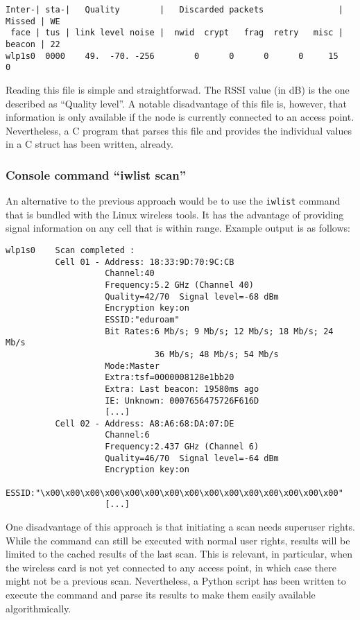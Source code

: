 \documentclass{scrartcl}
\begin{document}
\begin{verbatim}
Inter-| sta-|   Quality        |   Discarded packets               | Missed | WE
 face | tus | link level noise |  nwid  crypt   frag  retry   misc | beacon | 22
wlp1s0  0000    49.  -70. -256        0      0      0      0     15        0
\end{verbatim}

Reading this file is simple and straightforwad. The RSSI value (in dB) is the
one described as ``Quality level''. A notable disadvantage of this file is,
however, that information is only available if the node is currently connected
to an access point. Nevertheless, a C program that parses this file and
provides the individual values in a C struct has been written, already. 


\subsubsection*{Console command ``iwlist scan''}

An alternative to the previous approach would be to use the \verb#iwlist#
command that is bundled with the Linux wireless tools. It has the advantage
of providing signal information on any cell that is within range. Example output
is as follows:

\begin{verbatim}
wlp1s0    Scan completed :
          Cell 01 - Address: 18:33:9D:70:9C:CB
                    Channel:40
                    Frequency:5.2 GHz (Channel 40)
                    Quality=42/70  Signal level=-68 dBm  
                    Encryption key:on
                    ESSID:"eduroam"
                    Bit Rates:6 Mb/s; 9 Mb/s; 12 Mb/s; 18 Mb/s; 24 Mb/s
                              36 Mb/s; 48 Mb/s; 54 Mb/s
                    Mode:Master
                    Extra:tsf=0000008128e1bb20
                    Extra: Last beacon: 19580ms ago
                    IE: Unknown: 0007656475726F616D
                    [...]
          Cell 02 - Address: A8:A6:68:DA:07:DE
                    Channel:6
                    Frequency:2.437 GHz (Channel 6)
                    Quality=46/70  Signal level=-64 dBm  
                    Encryption key:on
                    ESSID:"\x00\x00\x00\x00\x00\x00\x00\x00\x00\x00\x00\x00\x00\x00\x00"
                    [...]
\end{verbatim}

One disadvantage of this approach is that initiating a scan needs superuser
rights. While the command can still be executed with normal user rights,
results will be limited to the cached results of the last scan. This is
relevant, in particular, when the wireless card is not yet connected to any
access point, in which case there might not be a previous scan.  Nevertheless,
a Python script has been written to execute the command and parse its results
to make them easily available algorithmically.
\end{document}
